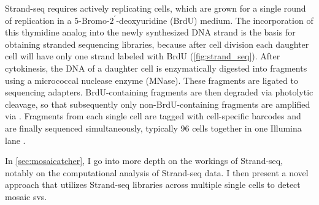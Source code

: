 
Strand-seq requires actively replicating cells, which are grown for a single
round of replication in a $5$-Bromo-$2^\prime$-deoxyuridine (BrdU) medium.
The incorporation of this thymidine analog into the newly synthesized DNA strand
is the basis for obtaining stranded sequencing libraries, because after cell
division each daughter cell will have only one strand labeled with BrdU
(\cref{fig:strand_seq}). After cytokinesis, the DNA of a daughter cell is
enzymatically digested into fragments using a micrococcal nuclease enzyme
(MNase). These fragments are ligated to sequencing adapters. BrdU-containing
fragments are then degraded via photolytic cleavage, so that
subsequently only non-BrdU-containing fragments are amplified via \pcr.
Fragments from each single cell are tagged with cell-specific barcodes and are
finally sequenced simultaneously, typically 96 cells together in one Illumina
lane \citep{Sanders2017}.

In \cref{sec:mosaicatcher}, I go into more depth on the workings of Strand-seq,
notably on the computational analysis of Strand-seq data. I then present a novel
approach that utilizes Strand-seq libraries across multiple single cells to
detect mosaic \acp{sv}.


